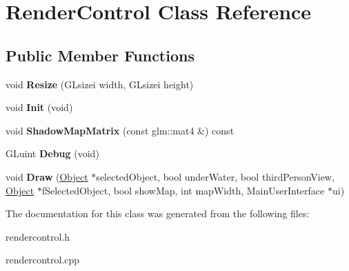 \hypertarget{classRenderControl}{\section{\-Render\-Control \-Class \-Reference}
\label{classRenderControl}
}
\subsection*{\-Public \-Member \-Functions}
\begin{DoxyCompactItemize}
\item 
\hypertarget{classRenderControl_a27ff96bb3b07efb33bdd11aa24b4f4b3}{void {\bfseries \-Resize} (\-G\-Lsizei width, \-G\-Lsizei height)}\label{classRenderControl_a27ff96bb3b07efb33bdd11aa24b4f4b3}

\item 
\hypertarget{classRenderControl_a0107433760a1f931231d6d4396130c01}{void {\bfseries \-Init} (void)}\label{classRenderControl_a0107433760a1f931231d6d4396130c01}

\item 
\hypertarget{classRenderControl_a1c242994dfc50db2c309fe451062c0ab}{void {\bfseries \-Shadow\-Map\-Matrix} (const glm\-::mat4 \&) const }\label{classRenderControl_a1c242994dfc50db2c309fe451062c0ab}

\item 
\hypertarget{classRenderControl_a4ee99e452cf748a1ccffce1f2665b6c7}{\-G\-Luint {\bfseries \-Debug} (void)}\label{classRenderControl_a4ee99e452cf748a1ccffce1f2665b6c7}

\item 
\hypertarget{classRenderControl_a68163d4e89d79a5520e124278ad63798}{void {\bfseries \-Draw} (\hyperlink{classObject}{\-Object} $\ast$selected\-Object, bool under\-Water, bool third\-Person\-View, \hyperlink{classObject}{\-Object} $\ast$f\-Selected\-Object, bool show\-Map, int map\-Width, \-Main\-User\-Interface $\ast$ui)}\label{classRenderControl_a68163d4e89d79a5520e124278ad63798}

\end{DoxyCompactItemize}


\-The documentation for this class was generated from the following files\-:\begin{DoxyCompactItemize}
\item 
rendercontrol.\-h\item 
rendercontrol.\-cpp\end{DoxyCompactItemize}
